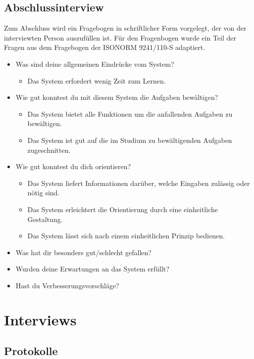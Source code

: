 \documentclass[a4paper,10pt]{scrartcl}
\begin{document}
\subsection{Abschlussinterview}

Zum Abschluss wird ein Fragebogen in schriftlicher Form vorgelegt, der von der interviewten Person auszufüllen ist. 
Für den Fragenbogen wurde ein Teil der Fragen aus dem Fragebogen 
der ISONORM 9241/110-S adaptiert.

\begin{itemize}

 \item Was sind deine allgemeinen Eindrücke vom System?
 \begin{itemize}
    \item Das System erfordert wenig Zeit zum Lernen.
 \end{itemize}
 \item Wie gut konntest du mit diesem System die Aufgaben bewältigen?
 \begin{itemize}
    \item Das System bietet alle Funktionen um die anfallenden Aufgaben zu bewältigen.
    \item Das System ist gut auf die im Studium zu bewältigenden Aufgaben zugeschnitten.
 \end{itemize}
 \item Wie gut konntest du dich orientieren?
 \begin{itemize}
    \item Das System liefert Informationen darüber, welche Eingaben zulässig oder nötig sind.
    \item Das System erleichtert die Orientierung durch eine einheitliche Gestaltung.
    \item Das System lässt sich nach einem einheitlichen Prinzip bedienen.
 \end{itemize}
 \item Was hat dir besonders gut/schlecht gefallen?
 \item Wurden deine Erwartungen an das System erfüllt?
 \item Hast du Verbesserungsvorschläge?
\end{itemize}

\section{Interviews}

\subsection*{Protokolle}
\end{document}
